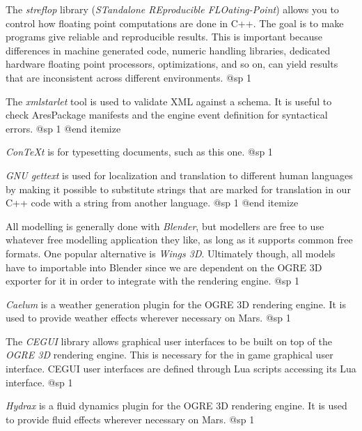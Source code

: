 \item
The {\it streflop} library ({\it STandalone REproducible FLOating-Point}) allows you to control how floating point computations are done in C++. The goal is to make programs give reliable and reproducible results. This is important because differences in machine generated code, numeric handling libraries, dedicated hardware floating point processors, optimizations, and so on, can yield results that are inconsistent across different environments.
@sp 1

\item
The {\it xmlstarlet} tool is used to validate XML against a schema. It is useful to check AresPackage manifests and the engine event definition for syntactical errors.
@sp 1
@end itemize



\itemize
\item
{\it ConTeXt} is for typesetting documents, such as this one.
@sp 1

\item
{\it GNU gettext} is used for localization and translation to different human languages by making it possible to substitute strings that are marked for translation in our C++ code with a string from another language.
@sp 1
@end itemize


\itemize
\item
All modelling is generally done with {\it Blender}, but modellers are free to use whatever free modelling application they like, as long as it supports common free formats. One popular alternative is {\it Wings 3D}. Ultimately though, all models have to importable into Blender since we are dependent on the OGRE 3D exporter for it in order to integrate with the rendering engine.
@sp 1

\item
{\it Caelum} is a weather generation plugin for the OGRE 3D rendering engine. It is used to provide weather effects wherever necessary on Mars.
@sp 1

\item
The {\it CEGUI} library allows graphical user interfaces to be built on top of the {\it OGRE 3D} rendering engine. This is necessary for the in game graphical user interface. CEGUI user interfaces are defined through Lua scripts accessing its Lua interface.
@sp 1

\item
{\it Hydrax} is a fluid dynamics plugin for the OGRE 3D rendering engine. It is used to provide fluid effects wherever necessary on Mars.
@sp 1

